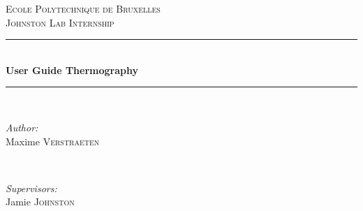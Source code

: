 \documentclass[a4paper]{article}
\begin{document}
\begin{titlepage}

\newcommand{\HRule}{\rule{\linewidth}{0.5mm}} %

\center %
 

\textsc{\LARGE Ecole Polytechnique de Bruxelles}\\[1.5cm] %
\textsc{\large Johnston Lab Internship}\\[0.5cm] %


\HRule \\[0.4cm]
{ \huge \bfseries User Guide Thermography}\\[0.4cm] %
\HRule \\[1.5cm]
 

\begin{minipage}{0.4\textwidth}
\begin{flushleft} \large
\emph{Author:}\\
Maxime \textsc{Verstraeten} %
\end{flushleft}
\end{minipage}
~
\begin{minipage}{0.4\textwidth}
\begin{flushright} \large
\emph{Supervisors:} \\
Jamie \textsc{Johnston}\\[0.3cm] %
\end{flushright}
\end{minipage}\\[2cm]



\end{titlepage}
\end{document}
